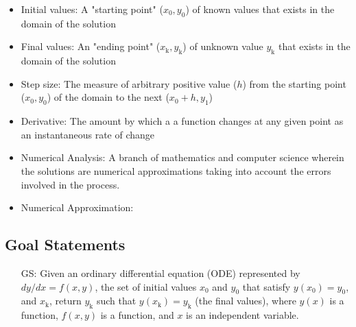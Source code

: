 \documentclass[12pt]{article}
\newcounter{goalnum} %
\begin{document}
\begin{itemize}

\item Initial values: A "starting point" ($x_\text{0}, y_\text{0}$) of known values that exists in the domain of the solution

\item Final values: An "ending point" ($x_\text{k}, y_\text{k}$) of unknown value $y_\text{k}$ that exists in the domain of the solution

\item Step size: The measure of arbitrary positive value ($h$) from the starting point ($x_\text{0}, y_\text{0}$) of the domain to the next ($x_\text{0}+h, y_\text{1}$)

\item Derivative: The amount by which a a function changes at any given point as an instantaneous
rate of change

\item Numerical Analysis: A branch of mathematics and computer science wherein the solutions
are numerical approximations taking into account the errors involved in the process.

\item Numerical Approximation: 

\end{itemize}

\subsection{Goal Statements} \label{Sec_gs}

\begin{itemize}

\item[GS\refstepcounter{goalnum}\thegoalnum \label{G_meaningfulLabel}:]{
Given an ordinary differential equation (ODE) represented by ${dy}/{dx} = f(x,y)$, the set of initial values
$x_\text{0}$ and $y_\text{0}$ that satisfy $y(x_\text{0}) = y_\text{0}$, and $x_\text{k}$, return $y_\text{k}$
such that $y(x_\text{k}) = y_\text{k}$ (the final values), where $y(x)$ is a function, $f(x,y)$ is a function,
and $x$ is an independent variable.}

\end{itemize}

\end{document}
